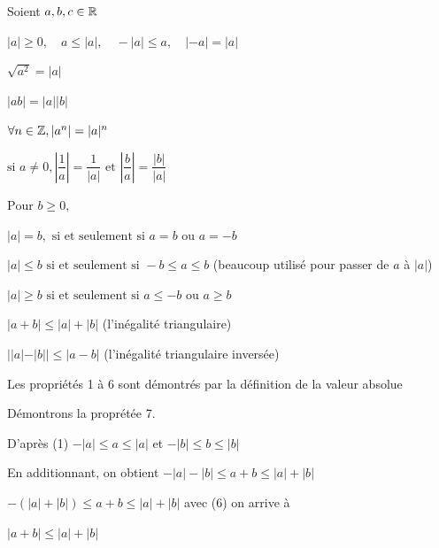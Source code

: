 \documentclass[a4paper, 12pt]{article}
\begin{document}

\noindent
Soient $a, b, c \in \mathbb{R}$

\begin{proprietes}
    \item $|a| \geq 0, \quad a \leq |a|, \quad -|a| \leq a, \quad |-a| = |a|$
    \item $\sqrt{a^2} = |a|$
    \item $|ab| = |a||b|$
    \item $\forall n \in \mathbb{Z}, |a^n| = |a|^n$
    \item $\text{si } a \neq 0, |\dfrac{1}{a}|=\dfrac{1}{|a|} \text{ et } |\dfrac{b}{a}| = \dfrac{|b|}{|a|}$
    \item
        $\text{Pour } b \geq 0,$
        
        $|a| = b, \text{ si et seulement si } a = b \text{ ou } a = -b$
        
        $|a| \leq b \text{ si et seulement si } -b \leq a \leq b$ (beaucoup utilisé pour passer de $a$ à $|a|$)

        $|a| \geq b \text{ si et seulement si } a \leq -b \text{ ou } a \geq b$
    \item $|a + b| \leq |a| + |b|$ (l'inégalité triangulaire)
    \item $||a| - |b|| \leq |a - b|$ (l'inégalité triangulaire inversée)
\end{proprietes}

Les propriétés 1 à 6 sont démontrés par la définition de la valeur absolue

Démontrons la proprétée 7.

\begin{demonstration}
    D'après (1) \quad
    $-|a| \leq a \leq |a|$ et $-|b| \leq b \leq |b|$
    
    En additionnant, on obtient $-|a|-|b| \leq a + b \leq |a| + |b|$

    $-(|a|+|b|) \leq a + b \leq |a| + |b|$ avec (6) on arrive à

    $|a + b| \leq |a| + |b|$
\end{demonstration}
\end{document}
